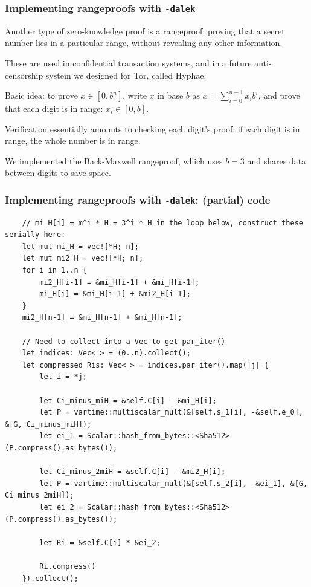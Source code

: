 \documentclass[xetex,aspectratio=169]{beamer}
\begin{document}
  \begin{frame}
    \frametitle{Implementing rangeproofs with \texttt{-dalek}}
    
    Another type of zero-knowledge proof is a \alert{rangeproof}:
    proving that a secret number lies in a particular range, without
    revealing any other information.
    
    \pause These are used in confidential transaction systems, and in
    a future anti-censorship system we designed for Tor, called Hyphae.
    
    \pause Basic idea: to prove $x \in [0, b^n]$, write $x$ in base
    $b$ as $x = \sum_{i=0}^{n-1} x_i b^i$, and prove that each digit
    is in range: $x_i \in [0,b]$.
    
    \pause Verification essentially amounts to checking each digit's
    proof: if each digit is in range, the whole number is in range.
    
    \pause We implemented the Back-Maxwell rangeproof, which uses
    $b=3$ and shares data between digits to save space.
  \end{frame}

\begin{frame}[fragile]
    \frametitle{Implementing rangeproofs with \texttt{-dalek}: (partial) code}
    {\tiny
    \begin{verbatim}
    // mi_H[i] = m^i * H = 3^i * H in the loop below, construct these serially here:
    let mut mi_H = vec![*H; n];
    let mut mi2_H = vec![*H; n];
    for i in 1..n {
        mi2_H[i-1] = &mi_H[i-1] + &mi_H[i-1];
        mi_H[i] = &mi_H[i-1] + &mi2_H[i-1];
    }
    mi2_H[n-1] = &mi_H[n-1] + &mi_H[n-1];

    // Need to collect into a Vec to get par_iter()
    let indices: Vec<_> = (0..n).collect();
    let compressed_Ris: Vec<_> = indices.par_iter().map(|j| {
        let i = *j;

        let Ci_minus_miH = &self.C[i] - &mi_H[i];
        let P = vartime::multiscalar_mult(&[self.s_1[i], -&self.e_0], &[G, Ci_minus_miH]);
        let ei_1 = Scalar::hash_from_bytes::<Sha512>(P.compress().as_bytes());

        let Ci_minus_2miH = &self.C[i] - &mi2_H[i];
        let P = vartime::multiscalar_mult(&[self.s_2[i], -&ei_1], &[G, Ci_minus_2miH]);
        let ei_2 = Scalar::hash_from_bytes::<Sha512>(P.compress().as_bytes());

        let Ri = &self.C[i] * &ei_2;

        Ri.compress()
    }).collect();
    \end{verbatim}
    }
\end{frame}
\end{document}
